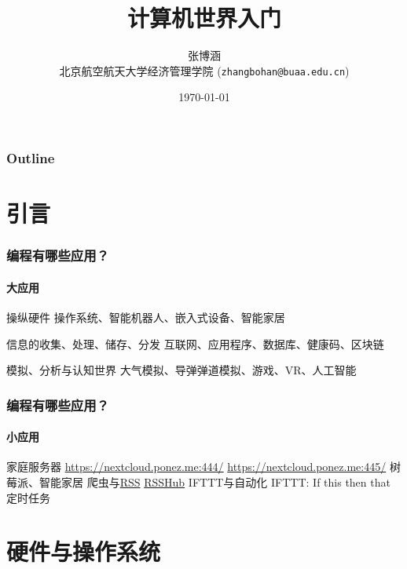 \documentclass[10pt]{beamer}
\title{计算机世界入门}
\author{张博涵\\
北京航空航天大学经济管理学院 (\texttt{zhangbohan@buaa.edu.cn})}
\date{\today}
\begin{document}
\begin{frame}[plain]
\maketitle
\end{frame}

\begin{frame}
\frametitle{Outline}
\tableofcontents
\end{frame}
\section{引言}
\begin{frame}
\frametitle{编程有哪些应用？}
\framesubtitle{大应用}
\begin{block}{操纵硬件}
    操作系统、智能机器人、嵌入式设备、智能家居
\end{block}
\begin{block}{信息的收集、处理、储存、分发}
    互联网、应用程序、数据库、健康码、区块链
\end{block}

\begin{block}{模拟、分析与认知世界}
    大气模拟、导弹弹道模拟、游戏、VR、人工智能
\end{block}
\end{frame}

\begin{frame}
\frametitle{编程有哪些应用？}
\framesubtitle{小应用}
    \begin{outline}
        \1 家庭服务器 
            \2 \url{https://nextcloud.ponez.me:444/}
            \2 \url{https://nextcloud.ponez.me:445/}
            \2 树莓派、智能家居
        \1 爬虫与\href{https://zh.m.wikipedia.org/zh/RSS}{RSS}
            \2 \href{https://docs.rsshub.app/}{RSSHub}
        \1 IFTTT与自动化
            \2 IFTTT: If this then that
            \2 定时任务
    \end{outline}
\end{frame}

\section{硬件与操作系统}
\end{document}
